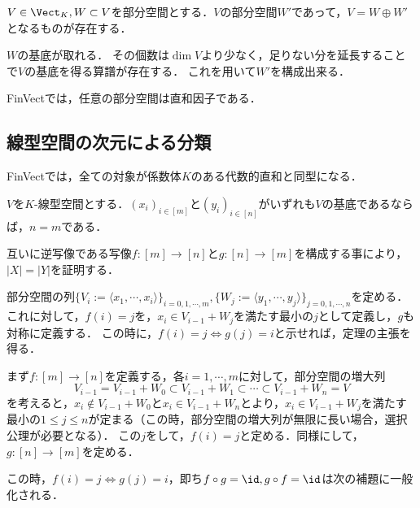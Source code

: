 \documentclass[uplatex, dvipdfmx]{jsreport}
\begin{document}
\begin{proposition}[補空間の存在]
    $V\in\Vect_K,W\subset V$を部分空間とする．$V$の部分空間$W'$であって，$V=W\oplus W'$となるものが存在する．
\end{proposition}
\begin{Proof}
    $W$の基底が取れる．
    その個数は$\dim V$より少なく，足りない分を延長することで$V$の基底を得る算譜が存在する．
    これを用いて$W'$を構成出来る．
\end{Proof}
\begin{remarks}
    FinVectでは，任意の部分空間は直和因子である．
\end{remarks}

\subsection{線型空間の次元による分類}

\begin{tcolorbox}[colframe=ForestGreen, colback=ForestGreen!10!white,breakable,colbacktitle=ForestGreen!40!white,coltitle=black,fonttitle=\bfseries\sffamily,
title=]
    FinVectでは，全ての対象が係数体$K$のある代数的直和と同型になる．
\end{tcolorbox}

\begin{theorem}\label{thm-dimention}
    $V$を$K$-線型空間とする．$(x_i)_{i\in [m]}$と$(y_i)_{i\in [n]}$がいずれも$V$の基底であるならば，$n=m$である．
\end{theorem}
\begin{Proof}
    互いに逆写像である写像$f:[m]\to[n]$と$g:[n]\to[m]$を構成する事により，$|X|=|Y|$を証明する．

    部分空間の列$\{V_i:=\langle x_1,\cdots,x_i\rangle\}_{i=0,1,\cdots,m},\{W_j:=\langle y_1,\cdots,y_j\rangle\}_{j=0,1,\cdots,n}$を定める．
    これに対して，$f(i)=j$を，$x_i\in V_{i-1}+W_j$を満たす最小の$j$として定義し，$g$も対称に定義する．
    この時に，$f(i)=j\Leftrightarrow g(j)=i$と示せれば，定理の主張を得る．

    まず$f:[m]\to[n]$を定義する，各$i=1,\cdots,m$に対して，部分空間の増大列
    \[ V_{i-1}=V_{i-1}+W_0\subset V_{i-1}+W_1\subset\cdots\subset V_{i-1}+W_n=V \]
    を考えると，$x_i\notin V_{i-1}+W_0$と$x_i\in V_{i-1}+W_n$とより，$x_i\in V_{i-1}+W_j$を満たす最小の$1\le j\le n$が定まる（この時，部分空間の増大列が無限に長い場合，選択公理が必要となる）．
    この$j$をして，$f(i)=j$と定める．同様にして，$g:[n]\to[m]$を定める．

    この時，$f(i)=j\Leftrightarrow g(j)=i$，即ち$f\circ g=\id,g\circ f=\id$は次の補題に一般化される．
\end{Proof}
\end{document}
